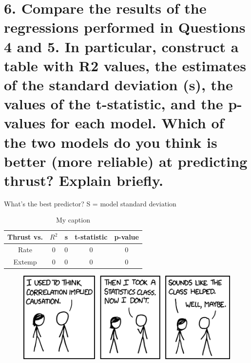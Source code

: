 \documentclass[letterpaper]{article}
\begin{document}
\section{6.	Compare the results of the regressions performed in Questions 4 and 5. In particular, construct a table with R2 values, the estimates of the standard deviation (s), the values of the t-statistic, and the p-values for each model. Which of the two models do you think is better (more reliable) at predicting thrust? Explain briefly.}
What’s the best predictor? S = model standard deviation

\begin{table}[H]
 \centering
 \begin{tabular}{|c|c|c|c|c|}
  \hline
  Thrust vs. & $R^2$ & s & t-statistic & p-value \\ \hline
  Rate       & 0     & 0 & 0           & 0       \\ \hline
  Extemp     & 0     & 0 & 0           & 0       \\ \hline
 \end{tabular}
 \caption{My caption}
 \label{q6}
\end{table}


\newpage
\thispagestyle{empty}
\begin{figure}
 \centering
 \includegraphics[width=\textwidth]{correlation.png}
 \label{xkcd}
\end{figure}
\end{document}
